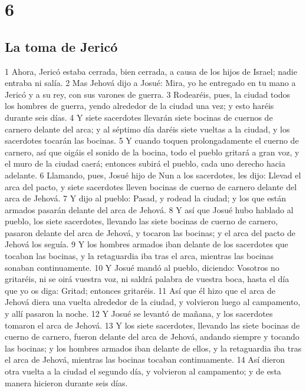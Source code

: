 \chapter{6}

\section*{La toma de Jericó}

1 Ahora, Jericó estaba cerrada, bien cerrada, a causa de los hijos de Israel; nadie entraba ni salía.
2 Mas Jehová dijo a Josué: Mira, yo he entregado en tu mano a Jericó y a su rey, con sus varones de guerra.
3 Rodearéis, pues, la ciudad todos los hombres de guerra, yendo alrededor de la ciudad una vez; y esto haréis durante seis días.
4 Y siete sacerdotes llevarán siete bocinas de cuernos de carnero delante del arca; y al séptimo día daréis siete vueltas a la ciudad, y los sacerdotes tocarán las bocinas.
5 Y cuando toquen prolongadamente el cuerno de carnero, así que oigáis el sonido de la bocina, todo el pueblo gritará a gran voz, y el muro de la ciudad caerá; entonces subirá el pueblo, cada uno derecho hacia adelante.
6 Llamando, pues, Josué hijo de Nun a los sacerdotes, les dijo: Llevad el arca del pacto, y siete sacerdotes lleven bocinas de cuerno de carnero delante del arca de Jehová.
7 Y dijo al pueblo: Pasad, y rodead la ciudad; y los que están armados pasarán delante del arca de Jehová.
8 Y así que Josué hubo hablado al pueblo, los siete sacerdotes, llevando las siete bocinas de cuerno de carnero, pasaron delante del arca de Jehová, y tocaron las bocinas; y el arca del pacto de Jehová los seguía.
9 Y los hombres armados iban delante de los sacerdotes que tocaban las bocinas, y la retaguardia iba tras el arca, mientras las bocinas sonaban continuamente.
10 Y Josué mandó al pueblo, diciendo: Vosotros no gritaréis, ni se oirá vuestra voz, ni saldrá palabra de vuestra boca, hasta el día que yo os diga: Gritad; entonces gritaréis.
11 Así que él hizo que el arca de Jehová diera una vuelta alrededor de la ciudad, y volvieron luego al campamento, y allí pasaron la noche.
12 Y Josué se levantó de mañana, y los sacerdotes tomaron el arca de Jehová.
13 Y los siete sacerdotes, llevando las siete bocinas de cuerno de carnero, fueron delante del arca de Jehová, andando siempre y tocando las bocinas; y los hombres armados iban delante de ellos, y la retaguardia iba tras el arca de Jehová, mientras las bocinas tocaban continuamente.
14 Así dieron otra vuelta a la ciudad el segundo día, y volvieron al campamento; y de esta manera hicieron durante seis días.
